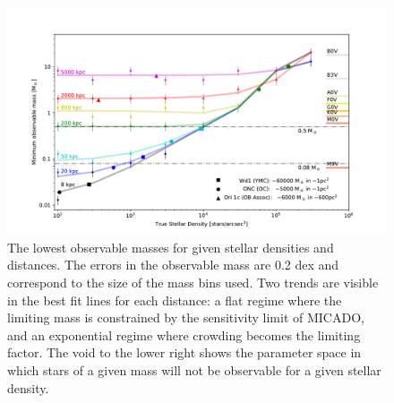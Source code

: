 \documentclass[referee]{aa}
\begin{document}
\begin{figure}

    \centering
    \includegraphics[width=\textwidth]{old_trusted_mass.pdf}

    \caption{The lowest observable masses for given stellar densities and distances.
    The errors in the observable mass are 0.2 dex and correspond to the size of the mass bins used.
    Two trends are visible in the best fit lines for each distance: a flat regime where the limiting mass is constrained by the sensitivity limit of MICADO, and an exponential regime where crowding becomes the limiting factor.
    The void to the lower right shows the parameter space in which stars of a given mass will not be observable for a given stellar density.
    }
    \label{fig:trusted_mass}
\end{figure}
\end{document}

